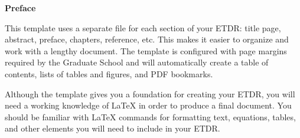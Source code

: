 \newpage

\begin{center}
    {\bf \Huge Preface}
\end{center}
\vspace{1cm}
\setlength{\baselineskip}{0.8cm}


This template uses a separate file for each section of your ETDR:
title page, abstract, preface, chapters, reference, etc.  This
makes it easier to organize and work with a lengthy document.  The
template is configured with page margins required by the Graduate
School and will automatically create a table of contents, lists of
tables and figures, and PDF bookmarks.

Although the template gives you a foundation for creating your
ETDR, you will need a working knowledge of LaTeX in order to
produce a final document.  You should be familiar with LaTeX
commands for formatting text, equations, tables, and other
elements you will need to include in your ETDR.
